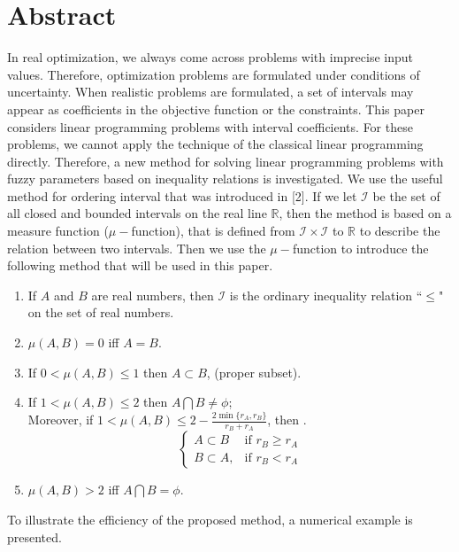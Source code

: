 \documentclass[article, A4, 11pt]{llncs}%
\begin{document}
\section*{Abstract}
In real optimization, we always come across problems with imprecise input values. Therefore, optimization problems are formulated under conditions of uncertainty. When realistic problems are formulated, a set of intervals may appear as coefficients in the objective function or the constraints. This paper considers linear programming problems with interval coefficients. For these problems, we cannot apply the technique of the classical linear programming directly. Therefore, a new method for solving linear programming problems with fuzzy parameters based on inequality relations  is investigated. We use the useful method for ordering interval that was introduced in [2]. If we let   $\mathscr{I}$ be the set of all closed and bounded intervals on the real line $\mathbb R$, then the method is based on a measure function ($\mu-$function), that is defined from $\mathscr{I} \times \mathscr{I}$ to $\mathbb R$ to describe the relation between two intervals. 
Then we use the $\mu-$function to introduce the following method that will be used in this paper.
            \begin{proposition}
            \begin{enumerate}
            \item If $A$ and $B$ are real numbers, then $\mathscr{I}$ is the  ordinary inequality
            relation ``$\leq$" on the set of real numbers.
            \item $\mu (A,B) = 0 $ iff $A=B$.
            \item If $0 < \mu (A,B) \leq 1 $ then $ A \subset B$, (proper subset).
            \item If $1 < \mu (A,B) \leq 2 $ then $ A \bigcap B\neq \phi$; \\ Moreover,
            if  $1 < \mu (A,B) \leq 2 - \frac{2 \min\{r_A,r_B\}}{r_B+r_A}$, then  .
                  $$\begin{cases}
                   A \subset B   &\textrm{if  $r_B  \geq r_A$}\\
                   B \subset A,&\textrm{if $r_B  < r_A$}
                   \end{cases}$$
            \item $  \mu (A,B) > 2$ iff $ A \bigcap B = \phi$.
            \end{enumerate}
            \end{proposition}
To illustrate the efficiency of the proposed method, a numerical 
example is presented.
\end{document}
